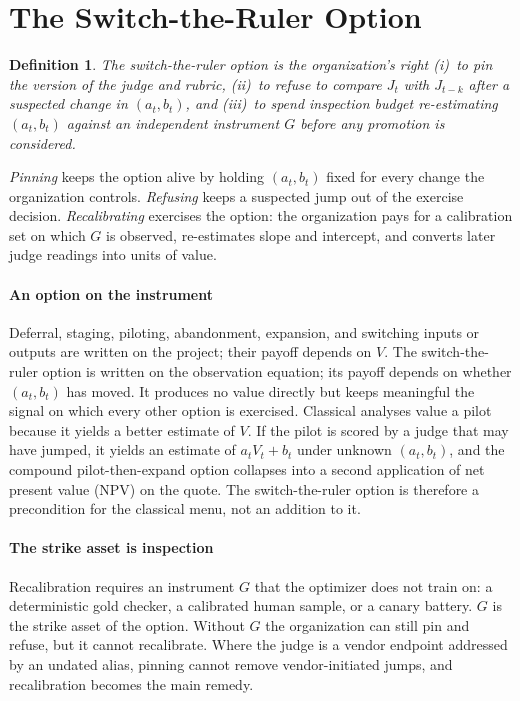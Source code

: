 \documentclass[acmsmall,screen,review,anonymous]{acmart}
\theoremstyle{acmdefinition}
\newtheorem{construct}{Definition}
\begin{document}
\section{The Switch-the-Ruler Option}\label{sec:switch}

\begin{construct}
The \emph{switch-the-ruler option} is the organization's right (i)~to pin the version of the judge and rubric, (ii)~to refuse to compare $J_t$ with $J_{t-k}$ after a suspected change in $(a_t,b_t)$, and (iii)~to spend inspection budget re-estimating $(a_t,b_t)$ against an independent instrument $G$ before any promotion is considered.
\end{construct}

\emph{Pinning} keeps the option alive by holding $(a_t,b_t)$ fixed for every change the organization controls. \emph{Refusing} keeps a suspected jump out of the exercise decision. \emph{Recalibrating} exercises the option: the organization pays for a calibration set on which $G$ is observed, re-estimates slope and intercept, and converts later judge readings into units of value.

\paragraph{An option on the instrument} Deferral, staging, piloting, abandonment, expansion, and switching inputs or outputs are written on the project; their payoff depends on $V$. The switch-the-ruler option is written on the observation equation; its payoff depends on whether $(a_t,b_t)$ has moved. It produces no value directly but keeps meaningful the signal on which every other option is exercised. Classical analyses value a pilot because it yields a better estimate of $V$. If the pilot is scored by a judge that may have jumped, it yields an estimate of $a_tV_t + b_t$ under unknown $(a_t,b_t)$, and the compound pilot-then-expand option collapses into a second application of net present value (NPV) on the quote. The switch-the-ruler option is therefore a precondition for the classical menu, not an addition to it.

\paragraph{The strike asset is inspection} Recalibration requires an instrument $G$ that the optimizer does not train on: a deterministic gold checker, a calibrated human sample, or a canary battery. $G$ is the strike asset of the option. Without $G$ the organization can still pin and refuse, but it cannot recalibrate. Where the judge is a vendor endpoint addressed by an undated alias, pinning cannot remove vendor-initiated jumps, and recalibration becomes the main remedy.
\end{document}
